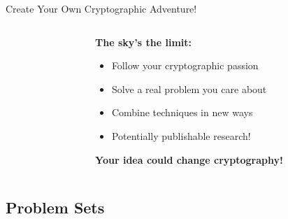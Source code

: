 \documentclass[aspectratio=169, lualatex, handout]{beamer}
\begin{document}
\begin{frame}{Create Your Own Cryptographic Adventure!}
	\begin{columns}[c]
		\begin{column}{0.5\textwidth}
		\end{column}
		\begin{column}{0.5\textwidth}
			\textbf{The sky's the limit:}
			\begin{itemize}[<+->]
				\item Follow your cryptographic passion
				\item Solve a real problem you care about
				\item Combine techniques in new ways
				\item Potentially publishable research!
			\end{itemize}
			\vspace{0.5cm}
			\textcolor{cipherprimary}{\textbf{Your idea could change cryptography!}}
		\end{column}
	\end{columns}
\end{frame}

\subsection{Problem Sets}
\end{document}
